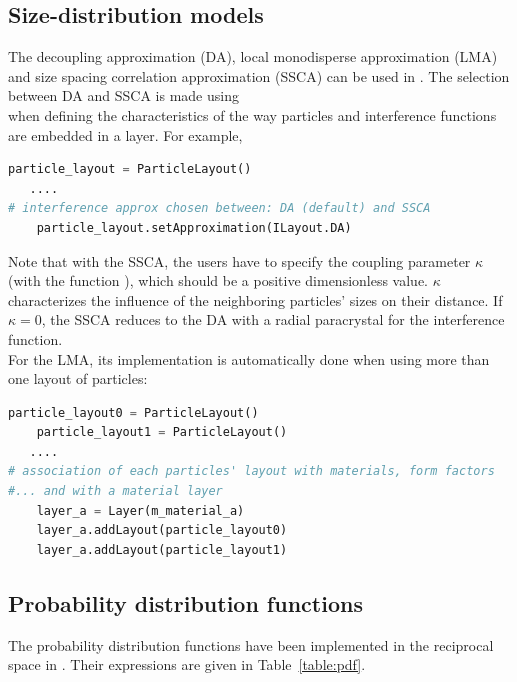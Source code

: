 \subsection{Size-distribution models}
The decoupling approximation (DA), local monodisperse approximation (LMA) and size spacing correlation approximation (SSCA) can be used in \BornAgain.
The selection between DA and SSCA is made using\\
 when defining the characteristics of the way particles and interference functions are embedded in a layer.  For example,
\begin{lstlisting}[language=python, style=eclipseboxed,numbers=none,nolol]
    particle_layout = ParticleLayout()
   ....
# interference approx chosen between: DA (default) and SSCA
    particle_layout.setApproximation(ILayout.DA)
\end{lstlisting}

Note that with the SSCA, the users have to specify the coupling parameter $\kappa$ (with the function ), which should be a positive dimensionless value. $\kappa$ characterizes the influence of the neighboring particles' sizes on their distance. If $\kappa=0$, the SSCA reduces to the DA with a radial paracrystal for the interference function.\\

For the LMA, its implementation is automatically done when using more than one layout of particles:
\begin{lstlisting}[language=python, style=eclipseboxed,numbers=none,nolol]
    particle_layout0 = ParticleLayout()
    particle_layout1 = ParticleLayout()
   ....
# association of each particles' layout with materials, form factors
#... and with a material layer
    layer_a = Layer(m_material_a)
    layer_a.addLayout(particle_layout0)
    layer_a.addLayout(particle_layout1)
\end{lstlisting}


\subsection{Probability distribution functions}\label{baftd}

The probability distribution functions have been implemented in the reciprocal space in \BornAgain. Their expressions are given in Table~\ref{table:pdf}.

